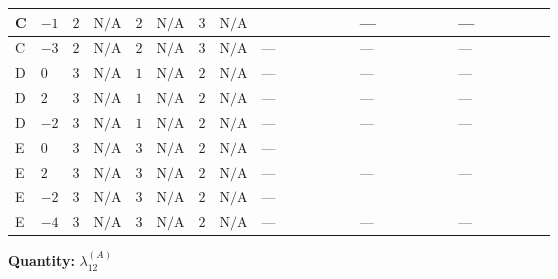 \documentclass[8pt]{article}
\begin{document}
\begin{landscape}
\begin{longtable}{@{}llcccccc >{\raggedright\arraybackslash}p{0.21\linewidth} >{\raggedright\arraybackslash}p{0.21\linewidth} >{\raggedright\arraybackslash}p{0.21\linewidth}@{}}
\midrule
C & $-1$ & $2$ & $\text{N/A}$ & $2$ & $\text{N/A}$ & $3$ & $\text{N/A}$ & \scriptsize\adjustbox{max width=\linewidth}{$\begin{gathered} +{g_1}^2 \left(-6 {g_2}^2-3 {\lambda_{12}^{(A)}}\right)\end{gathered}$} & --- & --- \\
\midrule
C & $-3$ & $2$ & $\text{N/A}$ & $2$ & $\text{N/A}$ & $3$ & $\text{N/A}$ & --- & --- & --- \\
\midrule
D & $0$ & $3$ & $\text{N/A}$ & $1$ & $\text{N/A}$ & $2$ & $\text{N/A}$ & --- & --- & --- \\
\midrule
D & $2$ & $3$ & $\text{N/A}$ & $1$ & $\text{N/A}$ & $2$ & $\text{N/A}$ & --- & --- & --- \\
\midrule
D & $-2$ & $3$ & $\text{N/A}$ & $1$ & $\text{N/A}$ & $2$ & $\text{N/A}$ & --- & --- & --- \\
\midrule
E & $0$ & $3$ & $\text{N/A}$ & $3$ & $\text{N/A}$ & $2$ & $\text{N/A}$ & --- & \scriptsize\adjustbox{max width=\linewidth}{$\begin{gathered} -\frac{1}{3} {\lambda_{X_{14}}} \left({\lambda_{X_{14}}}\right)^{*}\end{gathered}$} & \scriptsize\adjustbox{max width=\linewidth}{$\begin{gathered} -6 {g_1}^2 {\lambda_{12}^{(A)}}\end{gathered}$} \\
\midrule
E & $2$ & $3$ & $\text{N/A}$ & $3$ & $\text{N/A}$ & $2$ & $\text{N/A}$ & --- & --- & --- \\
\midrule
E & $-2$ & $3$ & $\text{N/A}$ & $3$ & $\text{N/A}$ & $2$ & $\text{N/A}$ & --- & \scriptsize\adjustbox{max width=\linewidth}{$\begin{gathered} -\frac{1}{3} {\lambda_{X_{12}}} \left({\lambda_{X_{12}}}\right)^{*}\end{gathered}$} & \scriptsize\adjustbox{max width=\linewidth}{$\begin{gathered} -6 {g_1}^2 {\lambda_{12}^{(A)}}\end{gathered}$} \\
\midrule
E & $-4$ & $3$ & $\text{N/A}$ & $3$ & $\text{N/A}$ & $2$ & $\text{N/A}$ & --- & --- & --- \\
\midrule
\bottomrule
\end{longtable}
\clearpage
\noindent\textbf{Quantity: }$\lambda_{12}^{(A)}$\par\smallskip

\end{landscape}
\end{document}
